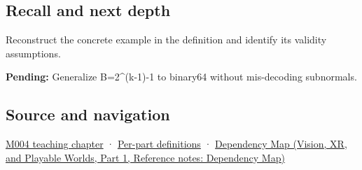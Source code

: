 \subsection{Recall and next depth}\label{appendix-2fae058c82e1-recall-and-next-depth}

\hypertarget{appendix-2fae058c82e1-recall-and-next-depth}{}

Reconstruct the concrete example in the definition and identify its validity assumptions.

\textbf{Pending:} Generalize B=2\^{}(k-1)-1 to binary64 without mis-decoding subnormals.

\subsection{Source and navigation}\label{appendix-2fae058c82e1-source-and-navigation}

\hypertarget{appendix-2fae058c82e1-source-and-navigation}{}

\hyperref[01-foundations-i-ch001-a-stretching-ruler-for-real-valued-quantities]{M004 teaching chapter} · \hyperref[appendix-fd090d982a15-m004---parts-61-76]{Per-part definitions} · \href{../07-Vision-XR-and-Playable-Worlds-P01/main.pdf\#appendix-4ad47bdd269a}{Dependency Map (Vision, XR, and Playable Worlds, Part 1, Reference notes: Dependency Map)}

